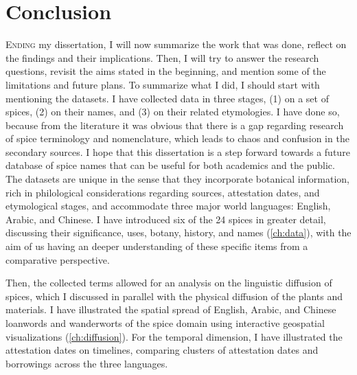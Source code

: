 \chapter{Conclusion}
\label{ch:conclusion}


\lettrine[lines=\iniciale]{\textcolor{\accentcolor}{E}}{nding} my dissertation, I will now summarize the work that was done, reflect on the findings and their implications. Then, I will try to answer the research questions, revisit the aims stated in the beginning, and mention some of the limitations and future plans. To summarize what I did, I should start with mentioning the datasets. I have collected data in three stages, (1) on a set of spices, (2) on their names, and (3) on their related etymologies. I have done so, because from the literature it was obvious that there is a gap regarding research of spice terminology and nomenclature, which leads to chaos and confusion in the secondary sources. I hope that this dissertation is a step forward towards a future database of spice names that can be useful for both academics and the public. The datasets are unique in the sense that they incorporate botanical information, rich in philological considerations regarding sources, attestation dates, and etymological stages, and accommodate three major world languages: English, Arabic, and Chinese. I have introduced six of the 24 spices in greater detail, discussing their significance, uses, botany, history, and names (\cref{ch:data}), with the aim of us having an deeper understanding of these specific items from a comparative perspective. 

Then, the collected terms allowed for an analysis on the linguistic diffusion of spices, which I discussed in parallel with the physical diffusion of the plants and materials. I have illustrated the spatial spread of English, Arabic, and Chinese loanwords and \glspl{wanderwort} of the spice domain using interactive geospatial visualizations (\cref{ch:diffusion}). For the temporal dimension, I have illustrated the attestation dates on timelines, comparing clusters of attestation dates and borrowings across the three languages. 

